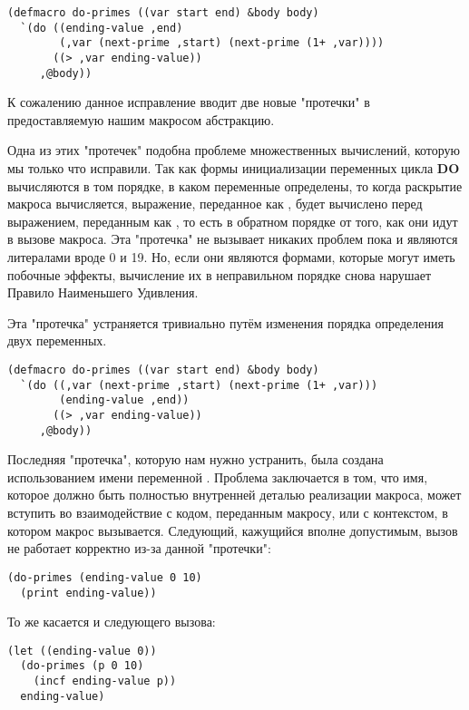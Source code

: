 \begin{lstlisting}
(defmacro do-primes ((var start end) &body body)
  `(do ((ending-value ,end)
        (,var (next-prime ,start) (next-prime (1+ ,var))))
       ((> ,var ending-value))
     ,@body))
\end{lstlisting}

К сожалению данное исправление вводит две новые "протечки" в предоставляемую нашим
макросом абстракцию.

Одна из этих "протечек" подобна проблеме множественных вычислений, которую мы только что
исправили. Так как формы инициализации переменных цикла \textbf{DO} вычисляются в том
порядке, в каком переменные определены, то когда раскрытие макроса вычисляется, выражение,
переданное как , будет вычислено перед выражением, переданным как ,
то есть в обратном порядке от того, как они идут в вызове макроса. Эта "протечка" не
вызывает никаких проблем пока  и  являются литералами вроде 0 и
19. Но, если они являются формами, которые могут иметь побочные эффекты, вычисление их в
неправильном порядке снова нарушает Правило Наименьшего Удивления.

Эта "протечка" устраняется тривиально путём изменения порядка определения двух переменных.

\begin{lstlisting}
(defmacro do-primes ((var start end) &body body)
  `(do ((,var (next-prime ,start) (next-prime (1+ ,var)))
        (ending-value ,end))
       ((> ,var ending-value))
     ,@body))
\end{lstlisting}

Последняя "протечка", которую нам нужно устранить, была создана использованием имени
переменной . Проблема заключается в том, что имя, которое должно быть
полностью внутренней деталью реализации макроса, может вступить во взаимодействие с кодом,
переданным макросу, или с контекстом, в котором макрос вызывается. Следующий, кажущийся
вполне допустимым, вызов  не работает корректно из-за данной "протечки":

\begin{lstlisting}
(do-primes (ending-value 0 10)
  (print ending-value))
\end{lstlisting}

То же касается и следующего вызова:

\begin{lstlisting}
(let ((ending-value 0))
  (do-primes (p 0 10)
    (incf ending-value p))
  ending-value)
\end{lstlisting}

